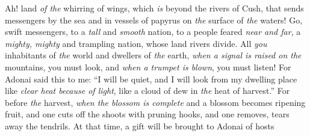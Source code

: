 \begin{biblechapter} %
 Ah! land \textit{of the} whirring of wings, 
which \textit{is} beyond the rivers of Cush,
\verse that sends messengers by the sea 
and in vessels of papyrus on \textit{the} surface of \textit{the} waters! 
Go, swift messengers, to a \textit{tall} and \textit{smooth} nation, 
to a people feared \textit{near and far}, 
a \textit{mighty, mighty} and trampling nation, 
whose land rivers divide.
\verse All \textit{you} inhabitants of \textit{the} world 
and dwellers of \textit{the} earth, 
\textit{when a signal is raised on the} mountains, you must look, 
and \textit{when a trumpet is blown}, you must listen!
\verse For Adonai said this to me:
\verse “I will be quiet, 
and I will look from my dwelling place 
like \textit{clear heat because of light}, 
like a cloud of dew in \textit{the} heat of harvest.”
\verse For before \textit{the} harvest, \textit{when the blossom is complete} 
and a blossom becomes ripening fruit, 
and one cuts off the shoots with pruning hooks, 
and one removes, tears away the tendrils.
\verse At that time, a gift will be brought to Adonai of hosts
\end{biblechapter}

